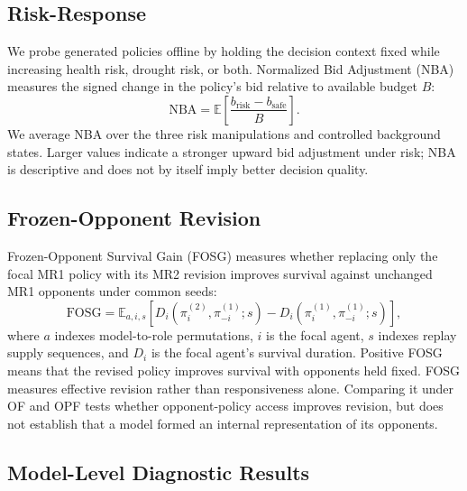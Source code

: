 \subsection{Risk-Response}

We probe generated policies offline by holding the decision context fixed
while increasing health risk, drought risk, or both. Normalized Bid Adjustment
(NBA) measures the signed change in the policy's bid relative to available
budget $B$:
\begin{equation}
    \mathrm{NBA}
    =
    \mathbb{E}\!\left[
        \frac{b_{\mathrm{risk}}-b_{\mathrm{safe}}}{B}
    \right].
\end{equation}
We average NBA over the three risk manipulations and controlled background
states. Larger values indicate a stronger upward bid adjustment under risk;
NBA is descriptive and does not by itself imply better decision quality.

\subsection{Frozen-Opponent Revision}

Frozen-Opponent Survival Gain (FOSG) measures whether replacing only the
focal MR1 policy with its MR2 revision improves survival against unchanged
MR1 opponents under common seeds:
\begin{equation}
    \mathrm{FOSG}
    =
    \mathbb{E}_{a,i,s}\!\left[
        D_i\!\left(\pi_i^{(2)},\pi_{-i}^{(1)};s\right)
        -D_i\!\left(\pi_i^{(1)},\pi_{-i}^{(1)};s\right)
    \right],
\end{equation}
where $a$ indexes model-to-role permutations, $i$ is the focal agent, $s$
indexes replay supply sequences, and $D_i$ is the focal agent's survival
duration. Positive FOSG means that the revised policy improves survival with
opponents held fixed. FOSG measures effective revision rather than
responsiveness alone. Comparing it under OF and OPF tests whether
opponent-policy access improves revision, but does not establish that a model
formed an internal representation of its opponents.

\subsection{Model-Level Diagnostic Results}

